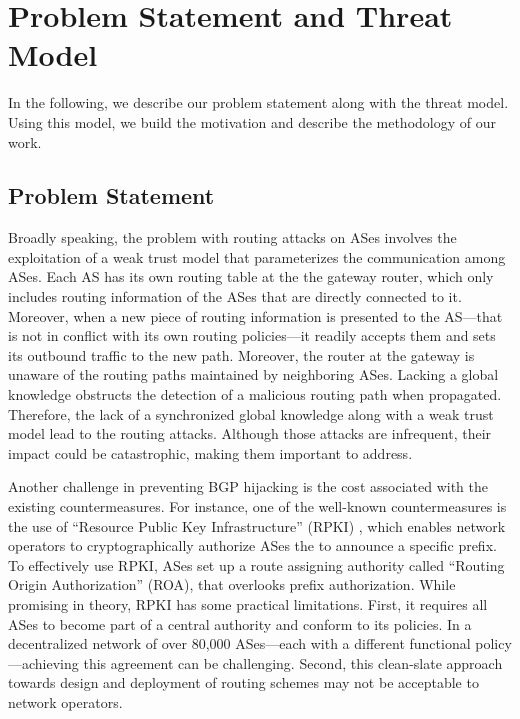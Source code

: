 \documentclass[5p]{elsarticle}
\begin{document}
\section{Problem Statement and Threat Model}\label{sec:ps}
In the following, we describe our problem statement along with the threat model. Using this model, we build the motivation and describe the methodology of our work.

\subsection{Problem Statement} \label{sec:psn}
Broadly speaking, the problem with routing attacks on ASes involves the exploitation of a weak trust model that parameterizes the communication among ASes. Each AS has its own routing table at the the gateway router, which only includes routing information of the ASes that are directly connected to it. Moreover, when a new  piece of routing information is presented to the AS---that is not in conflict with its own routing policies---it readily accepts them and sets its outbound traffic to the new path. Moreover, the router at the gateway is unaware of the routing paths maintained by neighboring ASes. Lacking a global knowledge obstructs the detection of a malicious routing path when propagated. Therefore, the lack of a synchronized global knowledge along with a weak trust model lead to the routing attacks. Although those attacks are infrequent, their impact could be catastrophic, making them important to address. 

Another challenge in preventing BGP hijacking is the cost associated with the existing countermeasures. For instance, one of the well-known countermeasures is the use of ``Resource Public Key Infrastructure'' (RPKI) \cite{rfc8481}, which enables network operators to cryptographically authorize ASes the to announce a specific prefix. To effectively use RPKI, ASes set up a route assigning authority called ``Routing Origin Authorization'' (ROA), that overlooks prefix authorization. While promising in theory, RPKI has some practical limitations. First, it requires all ASes to become part of a central authority and conform to its policies. In a decentralized network of over 80,000 ASes---each with a different functional policy---achieving this agreement can be challenging. Second, this clean-slate approach towards design and deployment of routing schemes may not be acceptable to network operators. 
\end{document}
